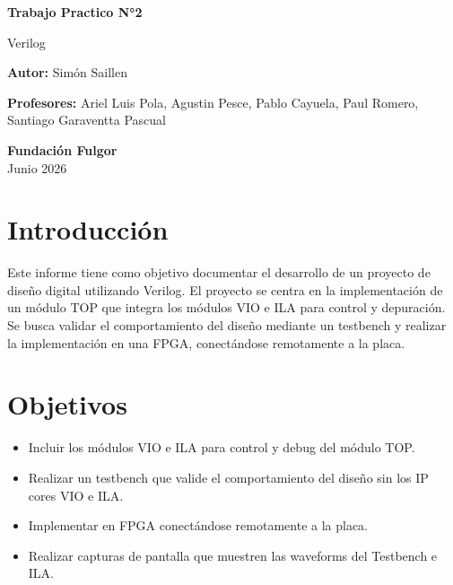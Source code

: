 \documentclass[11pt,a4paper]{article}
\begin{document}
\begin{titlepage}
    \begin{center}
        \vspace*{1cm}

        \Huge
        \textbf{Trabajo Practico N°2}

        \vspace{0.5cm}
        \LARGE
        Verilog

        \vspace{1.5cm}

        \vfill

        \Large
        \textbf{Autor:} Simón Saillen

        \Large
        \textbf{Profesores:} Ariel Luis Pola, Agustin Pesce, Pablo Cayuela, Paul Romero, Santiago Garaventta Pascual

        \vspace{0.5cm}

        \Large
        \textbf{Fundación Fulgor}\\
        Junio 2026

    \end{center}
\end{titlepage}
\newpage

\section{Introducción}

Este informe tiene como objetivo documentar el desarrollo de un proyecto de
diseño digital utilizando Verilog. El proyecto se centra en la implementación
de un módulo TOP que integra los módulos VIO e ILA para control y depuración.
Se busca validar el comportamiento del diseño mediante un testbench y realizar
la implementación en una FPGA, conectándose remotamente a la placa.

\section{Objetivos}

\begin{itemize}
    \item Incluir los módulos VIO e ILA para control y debug del módulo TOP.\@
    \item Realizar un testbench que valide el comportamiento del diseño sin los IP cores
          VIO e ILA.\@
    \item Implementar en FPGA conectándose remotamente a la placa.
    \item Realizar capturas de pantalla que muestren las waveforms del Testbench e ILA.\@
\end{itemize}
\end{document}
